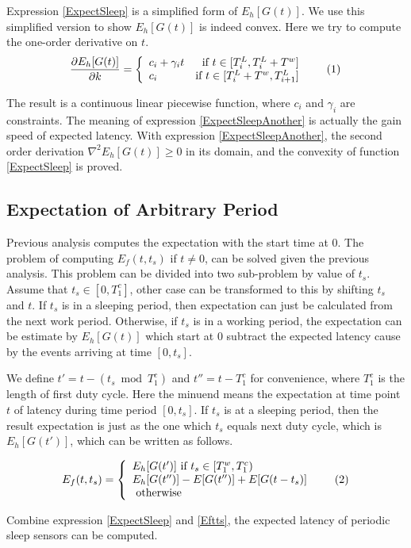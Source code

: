 \documentclass[conference]{IEEEtran}
\newcommand\numberthis{\addtocounter{equation}{1}\tag{\theequation}}
\begin{document}
Expression \eqref{ExpectSleep} is a simplified form of $E_h[G(t)]$.
We use this simplified version to show $E_h[G(t)]$ is indeed convex.
Here we try to compute the one-order derivative on $t$.
\[\frac{\partial E_h[G(t)]}{\partial k} = \left\{
\begin{array}{lr}
c_i+\gamma_i t & \text{if }t \in [T^{L}_{i}, T^{L}_{i}+T^{w}]\\
c_i & \text{if }t \in [T^{L}_{i}+T^{w}, T^{L}_{i+1}]
\end{array}	\numberthis \label{ExpectSleepAnother}
\right.
\]

The result is a continuous linear piecewise function, where $c_i$ and $\gamma_i$ are constraints.
The meaning of expression \eqref{ExpectSleepAnother} is actually the gain speed of expected latency. 
With expression \eqref{ExpectSleepAnother}, the second order derivation $\nabla^{2} E_h[G(t)]\geq0$ in its domain, and the convexity of function \eqref{ExpectSleep} is proved. 

\subsection{Expectation of Arbitrary Period}
Previous analysis computes the expectation with the start time at $0$. 
The problem of computing $E_f(t,t_s)$ if $t\ne0$, can be solved given the previous analysis. 
This problem can be divided into two sub-problem by value of $t_s$.
Assume that $t_s\in [0,T^{c}_{1}]$, other case can be transformed to this by shifting $t_s$ and $t$.
If $t_s$ is in a sleeping period, then expectation can just be calculated from the next work period.
Otherwise, if $t_s$ is in a working period, the expectation can be estimate by $E_h[G(t)]$ which start at $0$ subtract the expected latency cause by the events arriving at time $[0, t_s]$.

We define $t'=t-(t_s\bmod T^{c}_{1})$ and $t''=t-T^{c}_{1}$ for convenience, where $T^{c}_{1}$ is the length of first duty cycle.
Here the minuend means the expectation at time point $t$ of latency during time period $[0, t_s]$.
If $t_s$ is at a sleeping period, then the result expectation is just as the one which $t_s$ equals next duty cycle, which is $E_h[G(t')]$, which can be written as follows.

\begin{align*}
E_f(t,t_s)=\left\{
\begin{array}{lr}
E_h[G(t')]\text{ if } t_s\in [T^{w}_{1}, T^{c}_{1})\\
E_h[G(t'')]-E[G(t'')]+E[G(t-t_s)]\\
\text{ otherwise }
\end{array}\numberthis \label{Eftts}
\right.
\end{align*}

Combine expression \eqref{ExpectSleep} and \eqref{Eftts}, the expected latency of periodic sleep sensors can be computed.
\end{document}
